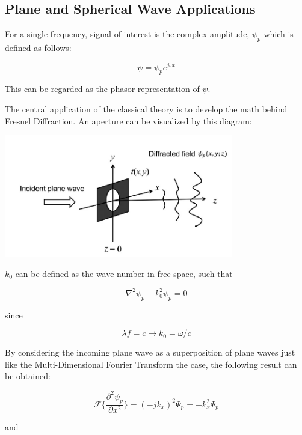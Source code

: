 \documentclass[12pt]{article}
\begin{document}
\subsection{Plane and Spherical Wave Applications}

For a single frequency, signal of interest is the complex amplitude, \(\psi_{p}\) which is defined as follows:

\begin{equation}
	\psi = \psi_{p}e^{j \omega t}
\end{equation}

This can be regarded as the phasor representation of \(\psi\).

The central application of the classical theory is to develop the math behind Fresnel Diffraction. An aperture can be visualized by this diagram:
\begin{center}
\includegraphics[width=100mm]{tupac5.png}
\end{center}

\(k_{0}\) can be defined as the wave number in free space, such that

\begin{equation}
	\nabla^2\psi_{p} + k_{0}^2\psi_{p} = 0
\end{equation}

since

\begin{equation}
	\lambda f = c \rightarrow k_{0} = \omega/c
\end{equation}

By considering the incoming plane wave as a superposition of plane waves just like the Multi-Dimensional Fourier Transform the case, the following result can be obtained:

\begin{equation}
	\mathscr{F} \Big\{ \frac{\partial^2 \psi_{p}}{\partial x^2} \Big\} = (-jk_{x})^2\Psi_{p} = -k_{x}^2\Psi_{p}
\end{equation}

and
\end{document}
